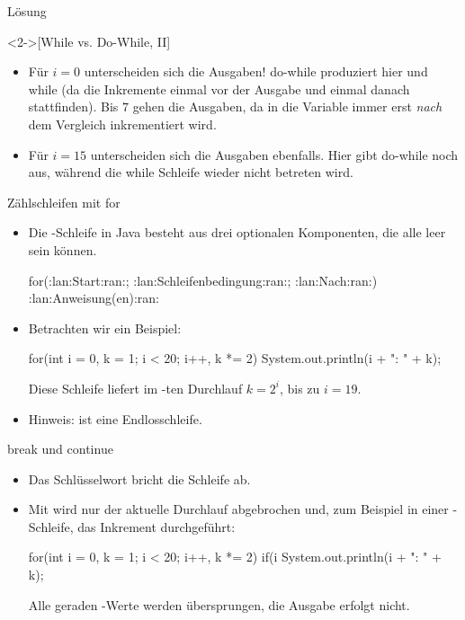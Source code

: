     \begin{frame}[c,fragile]{Lösung}
        \begin{solve}<2->[While vs. Do-While, II]
            \begin{itemize}[<+(1)->]
            \item Für \(i = 0\) unterscheiden sich die Ausgaben! do-while produziert hier  und while  (da die Inkremente einmal vor der Ausgabe und einmal danach stattfinden). Bis \(7\) gehen die Ausgaben, da in  die Variable  immer erst \emph{nach} dem Vergleich inkrementiert wird.
            \item Für \(i = 15\) unterscheiden sich die Ausgaben ebenfalls. Hier gibt do-while noch  aus, während die while Schleife wieder nicht betreten wird.
            \end{itemize}
        \end{solve}
    \end{frame}
\fi

\begin{frame}[fragile]{Zählschleifen mit for}
    \begin{itemize}[<+(1)->]
        \widei
        \item Die -Schleife in Java besteht aus drei optionalen Komponenten,\pause{} die alle leer sein können.
        \begin{plainjava}
for(:lan:Start:ran:; :lan:Schleifenbedingung:ran:; :lan:Nach:ran:) {
    :lan:Anweisung(en):ran:
}
        \end{plainjava}
        \item Betrachten wir ein Beispiel:\pause{}
\begin{plainjava}
for(int i = 0, k = 1; i < 20; i++, k *= 2)
    System.out.println(i + ": " + k);
\end{plainjava}
    \pause{}Diese Schleife liefert im -ten Durchlauf \(k = 2^i\),\pause{} bis zu \(i = 19\).
        \item Hinweis:  ist eine Endlosschleife.
    \end{itemize}
\end{frame}

\begin{frame}[fragile]{break und continue}
    \begin{itemize}[<+(1)->]
        \widei
        \item Das Schlüsselwort  bricht die  Schleife ab.
        \item Mit  wird nur der aktuelle Durchlauf abgebrochen und,\pause{} zum Beispiel in einer -Schleife,\pause{} das Inkrement durchgeführt:\pause{}
\begin{plainjava}
for(int i = 0, k = 1; i < 20; i++, k *= 2) {
    if(i %
    System.out.println(i + ": " + k);
}
\end{plainjava}
        \pause{}Alle geraden -Werte werden übersprungen, die Ausgabe erfolgt nicht.
    \end{itemize}
\end{frame}

